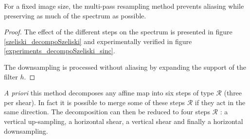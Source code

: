 
	\begin{prop}
	For a fixed image size, the multi-pass resampling method \cite{szeliski2010high} prevents aliasing while preserving as much of the spectrum as possible. %
	\end{prop}
	\begin{proof}
	The effect of the different steps on the spectrum is presented in figure \ref{szeliski_decompoSzeliski} and experimentally verified in figure \ref{experiments_decompoSzeliski_sinc}.
	
\noindent	The downsampling is processed without aliasing by expanding the support of the filter $h$.
	\end{proof}
	
	


	\emph{A priori} this method decomposes any affine map into six steps of type $\mathcal R$ (three per shear). In fact it is possible to merge some of these steps $\mathcal R$ if they act in the same direction. The decomposition can then be reduced to four steps $\mathcal R$ : a vertical up-sampling, a horizontal shear, a vertical shear and finally a horizontal downsampling.
	
	
